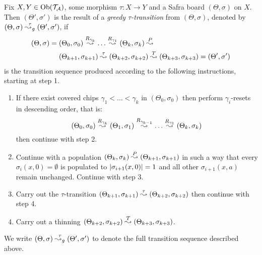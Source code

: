 \begin{definition}\label{def:greedy-step}
  Fix $X, Y \in \mathrm{Ob}(\mathcal{T}_{\mathcal{A}})$, some morphism $\tau \colon X \to Y$ and a Safra board
  $(\Theta, \sigma)$ on $X$. Then $(\Theta', \sigma')$ is the result of
  a \emph{greedy $\tau$-transition} from $(\Theta, \sigma)$, denoted by
  $(\Theta, \sigma) \stackrel{\tau}{\leadsto_g} (\Theta', \sigma')$, if
  \begin{align*}
    (\Theta, \sigma) =\;& (\Theta_0, \sigma_0)
    \stackrel{R_{\gamma_k}}{\leadsto} \ldots
    \stackrel{R_{\gamma_1}}{\leadsto} (\Theta_k, \sigma_k)
    \stackrel{P}{\leadsto} \\ & (\Theta_{k + 1}, \sigma_{k + 1}) \stackrel{\tau}{\leadsto}
    (\Theta_{k + 2}, \sigma_{k + 2})
    \stackrel{T}{\leadsto} (\Theta_{k + 3}, \sigma_{k + 3})
    = (\Theta', \sigma')
  \end{align*}
  is the transition sequence produced according to the following
  instructions, starting at step 1.
  \begin{enumerate}
  \item If there exist covered chips $\gamma_1 < \ldots < \gamma_k$ in
    $(\Theta_0, \sigma_0)$ then perform $\gamma_i$-resets in descending order,
    that is:
    \[(\Theta_0, \sigma_0) \stackrel{R_{\gamma_k}}{\leadsto} (\Theta_1, \sigma_1)
      \stackrel{R_{\gamma_{k - 1}}}{\leadsto} \ldots
      \stackrel{R_{\gamma_1}}{\leadsto} (\Theta_k, \sigma_k)\]
    then continue with step 2.
  \item Continue with a population $(\Theta_k,
    \sigma_k) \stackrel{P}{\leadsto} (\Theta_{k + 1}, \sigma_{k + 1})$ in such a way that
    every $\sigma_i(x, 0) = \emptyset$ is populated to $|\sigma_{i + 1}(x,
      0)| = 1$ and all other $\sigma_{i + 1}(x, a)$ remain unchanged.
    Continue with step 3.
  \item Carry out the $\tau$-transition $(\Theta_{k + 1}, \sigma_{k + 1}) \stackrel{\tau}{\leadsto}
    (\Theta_{k + 2}, \sigma_{k + 2})$ then continue with step 4.
  \item Carry out a thinning $(\Theta_{k + 2},
    \sigma_{k + 2}) \stackrel{T}{\leadsto} (\Theta_{k + 3}, \sigma_{k + 3})$.
  \end{enumerate}
  We write $(\Theta, \sigma)
  \stackrel{\tau}{\leadsto_g} (\Theta', \sigma')$ to denote the full transition sequence
  described above.
\end{definition}

